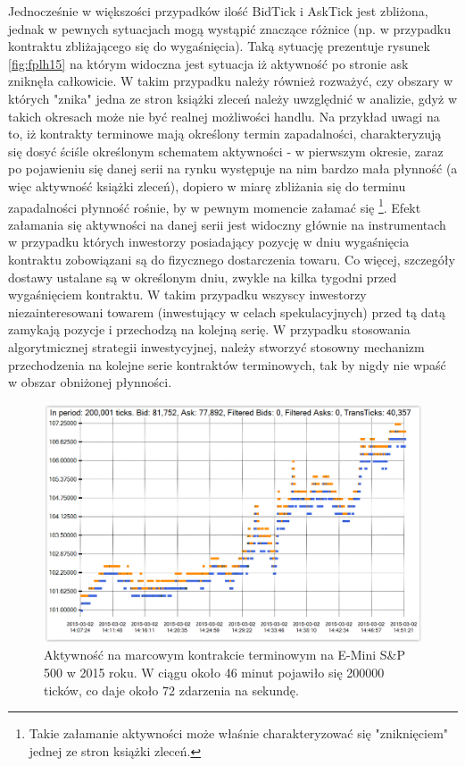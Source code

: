 \documentclass[a4paper,12pt,openany, DIV=calc, headsepline]{scrbook}
\begin{document}
Jednocześnie w większości przypadków ilość BidTick i AskTick jest zbliżona, jednak w pewnych sytuacjach mogą wystąpić znaczące różnice (np. w przypadku kontraktu zbliżającego się do wygaśnięcia). Taką sytuację prezentuje rysunek \ref{fig:fplh15} na którym widoczna jest sytuacja iż aktywność po stronie ask zniknęła całkowicie. W takim przypadku należy również rozważyć, czy obszary w których "znika" jedna ze stron książki zleceń należy uwzględnić w analizie, gdyż w takich okresach może nie być realnej możliwości handlu.  Na przykład uwagi na to, iż kontrakty terminowe mają określony termin zapadalności, charakteryzują się dosyć ściśle określonym schematem aktywności - w pierwszym okresie, zaraz po pojawieniu się danej serii na rynku występuje na nim bardzo mała płynność (a więc aktywność książki zleceń), dopiero w miarę zbliżania się do terminu zapadalności płynność rośnie, by w pewnym momencie załamać się \footnote{Takie załamanie aktywności może właśnie charakteryzować się "zniknięciem" jednej ze stron książki zleceń.}.
Efekt załamania się aktywności na danej serii jest widoczny głównie na instrumentach w przypadku których inwestorzy posiadający pozycję w dniu wygaśnięcia kontraktu zobowiązani są do fizycznego dostarczenia towaru. Co więcej, szczegóły dostawy ustalane są w określonym dniu, zwykle na kilka tygodni przed wygaśnięciem kontraktu. W takim przypadku wszyscy inwestorzy niezainteresowani towarem (inwestujący w celach spekulacyjnych) przed tą datą zamykają pozycje i przechodzą na kolejną serię. W przypadku stosowania algorytmicznej strategii inwestycyjnej, należy stworzyć stosowny mechanizm przechodzenia na kolejne serie kontraktów terminowych, tak by nigdy nie wpaść w obszar obniżonej płynności.

\begin{figure}[H]
  \centering
  \includegraphics[scale=0.5]{wykresy/fESH.PNG}
  \caption{Aktywność na marcowym kontrakcie terminowym na E-Mini S\&P 500 w 2015 roku. W ciągu około 46 minut pojawiło się 200000 ticków, co daje około 72 zdarzenia na sekundę.}
  \label{fig:spticks}
\end{figure}
\end{document}
